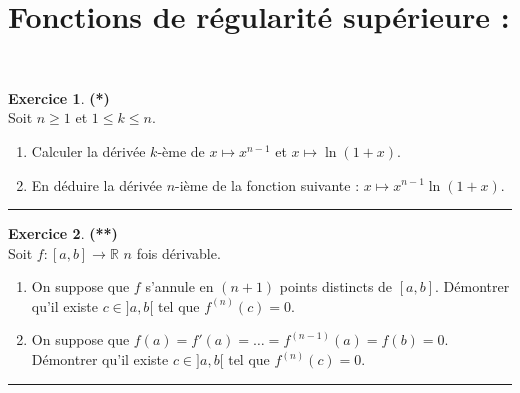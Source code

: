 \documentclass[a4paper,11pt]{article}
\theoremstyle{definition}
\newtheorem{exo}{Exercice} %
\begin{document}
\section*{Fonctions de régularité supérieure :}\hfill\\
\begin{minipage}{1\linewidth}
	\begin{minipage}[c]{0.48\linewidth}
		\raggedright
		
			\begin{exo}\textbf{(*)}\quad\\[0.2cm]
			Soit $n\geq 1$ et $1\leq k\leq n$. 
			\begin{enumerate}
				\item Calculer la dérivée $k$-ème de $x\mapsto x^{n-1}$ et $x\mapsto \ln(1+x)$.
				\item En déduire la dérivée $n$-ième de la fonction suivante :
				$x\mapsto x^{n-1}\ln(1+x).$
			\end{enumerate}
			
			\centering
			\rule{1\linewidth}{0.6pt}
		\end{exo}
	

		
	
		
	\end{minipage}	
	\hfill\vrule\hfill
	\begin{minipage}[c]{0.48\linewidth}
		\raggedright
		
			\begin{exo}\textbf{(**)}\quad\\[0.2cm]
			Soit $f:[a,b]\to\mathbb R$ $n$ fois dérivable.
			\begin{enumerate}
				\item On suppose que $f$ s'annule en $(n+1)$ points distincts de $[a,b]$. Démontrer qu'il existe $c\in ]a,b[$ tel que $f^{(n)}(c)=0$.
				\item On suppose que $f(a)=f'(a)=\dots=f^{(n-1)}(a)=f(b)=0$. Démontrer qu'il existe $c\in ]a,b[$ tel que $f^{(n)}(c)=0$.
			\end{enumerate}
			
			\centering
			\rule{1\linewidth}{0.6pt}
		\end{exo}
		
		
	\end{minipage}
\end{minipage}

\newpage
\end{document}
